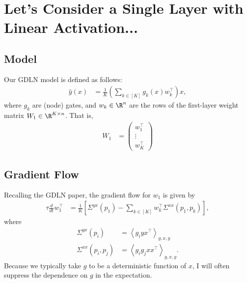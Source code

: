 \documentclass{article}
\begin{document}
\section{Let's Consider a Single Layer with Linear Activation...}

\subsection{Model}
Our GDLN model is defined as follows:
\begin{align}
  \hat{y}(x) &= \frac{1}{K} \left( \sum_{k \in [K]} g_k(x) w_k^\top \right) x, \label{eq:gdln_model}
\end{align}
where $g_k$ are (node) gates, and $w_k \in \R^n$ are the rows of the first-layer weight matrix $W_1 \in \R^{K \times n}$.
That is,
\begin{align}
  W_1 &= \begin{pmatrix} w_1^\top \\ \vdots \\ w_K^\top \end{pmatrix}
\end{align}

\subsection{Gradient Flow}
Recalling the GDLN paper, the gradient flow for $w_1$ is given by
\begin{align}
  \tau \frac{d}{dt} w_1^\top &= \frac{1}{K} \left[ \Sigma^{yx}(p_1) - \sum_{k \in [K]} w_k^\top \Sigma^{xx}(p_1,p_k) \right], \label{eq:grad_flow}
\end{align}
where
\begin{align}
  \Sigma^{yx}(p_i) &= \left\langle g_i y x^\top \right\rangle_{g,x,y} \\
  \Sigma^{xx}(p_i,p_j) &= \left\langle g_i g_j x x^\top \right\rangle_{g,x,y}.
\end{align}
Because we typically take $g$ to be a deterministic function of $x$, I will often suppress the dependence on $g$ in the expectation.
\end{document}
